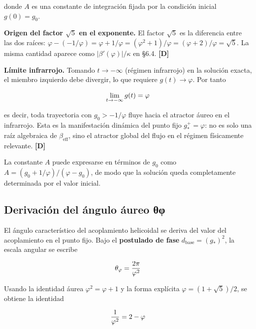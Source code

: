 ﻿\documentclass[11pt,letterpaper]{article}
\begin{document}
donde $A$ es una constante de integración fijada por la condición inicial $g(0) = g_0$.

\textbf{Origen del factor $\sqrt{5}$ en el exponente.} El factor $\sqrt{5}$ es la diferencia entre las dos raíces: $\varphi - (-1/\varphi) = \varphi + 1/\varphi = (\varphi^2 + 1)/\varphi = (\varphi + 2)/\varphi = \sqrt{5}$. La misma cantidad aparece como $|\beta'(\varphi)|/\kappa$ en §6.4. \textbf{[D]}

\textbf{Límite infrarrojo.} Tomando $t \to -\infty$ (régimen infrarrojo) en la solución exacta, el miembro izquierdo debe divergir, lo que requiere $g(t) \to \varphi$. Por tanto

\begin{equation*}
  \resizebox{\ifdim\width>\linewidth \linewidth\else\width\fi}{!}{$\displaystyle \lim_{t \to -\infty} g(t) = \varphi$}
\end{equation*}

es decir, toda trayectoria con $g_0 > -1/\varphi$ fluye hacia el atractor áureo en el infrarrojo. Esta es la manifestación dinámica del punto fijo $g_*^+ = \varphi$: no es solo una raíz algebraica de $\beta_{\text{eff}}$, sino el atractor global del flujo en el régimen físicamente relevante. \textbf{[D]}

La constante $A$ puede expresarse en términos de $g_0$ como $A = (g_0 + 1/\varphi)/(\varphi - g_0)$, de modo que la solución queda completamente determinada por el valor inicial.
\subsection{Derivación del ángulo áureo θφ}
El ángulo característico del acoplamiento helicoidal se deriva del valor del acoplamiento en el punto fijo. Bajo el \textbf{postulado de fase} $d_{\text{base}} = (g_*)^2$, la escala angular se escribe

\begin{equation*}
  \resizebox{\ifdim\width>\linewidth \linewidth\else\width\fi}{!}{$\displaystyle \theta_\varphi = \frac{2\pi}{\varphi^2}$}
\end{equation*}

Usando la identidad áurea $\varphi^2 = \varphi + 1$ y la forma explícita $\varphi = (1 + \sqrt{5})/2$, se obtiene la identidad

\begin{equation*}
  \resizebox{\ifdim\width>\linewidth \linewidth\else\width\fi}{!}{$\displaystyle \frac{1}{\varphi^2} = 2 - \varphi$}
\end{equation*}
\end{document}

